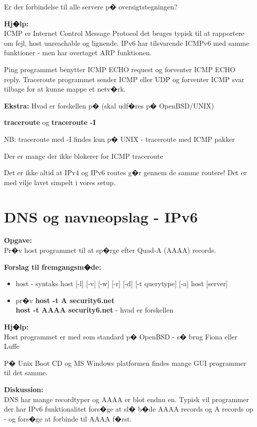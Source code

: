\documentclass[a4paper,11pt,notitlepage]{oevelser}
\begin{document}
Er der forbindelse til alle servere p� oversigtstegningen?

{\bfseries Hj�lp:} \\
ICMP er Internet Control Message Protocol det bruges typisk til at
rapportere om fejl, host unreachable og lignende. IPv6 har tilsvarende ICMPv6 med samme funktioner - men har overtaget ARP funktionen.

Ping programmet benytter ICMP ECHO request og forventer ICMP ECHO
reply. Traceroute programmet sender ICMP eller UDP og forventer ICMP
svar tilbage for at kunne mappe et netv�rk.

{\bf Ekstra:}
Hvad er forskellen p� (skal udf�res p� OpenBSD/UNIX)
\begin{list2}
\item {\bfseries traceroute} og {\bfseries traceroute -I}
\item NB: traceroute med -I findes kun p� UNIX - traceroute med ICMP pakker
\item Der er mange der ikke blokerer for ICMP traceroute
\end{list2}

Det er ikke altid at IPv4 og IPv6 routes g�r gennem de samme routere! Det er med vilje lavet simpelt i vores setup.

\chapter{DNS og navneopslag - IPv6}
\label{ex:basic-dns-lookup6}

{\bfseries Opgave:}\\
Pr�v host programmet til at sp�rge efter Quad-A (AAAA) records.

{\bfseries Forslag til fremgangsm�de:}\\
\begin{itemize}
\item host - syntaks host [-l] [-v] [-w] [-r] [-d] [-t querytype] [-a] host [server]
\item pr�v {\bfseries host -t A security6.net} \\
{\bfseries host -t AAAA security6.net} - hvad er forskellen
\end{itemize}

{\bfseries Hj�lp:}\\
Host programmet er med som standard p� OpenBSD - s� brug Fiona eller Luffe

P� Unix Boot CD og MS Windows platformen findes mange GUI programmer til det samme.

{\bfseries Diskussion:}\\
DNS har mange recordtyper og AAAA er blot endnu en. Typisk vil programmer der har IPv6 funktionalitet fors�ge at sl� b�de AAAA records og A records op - og fors�ge at forbinde til AAAA f�rst.
\end{document}
